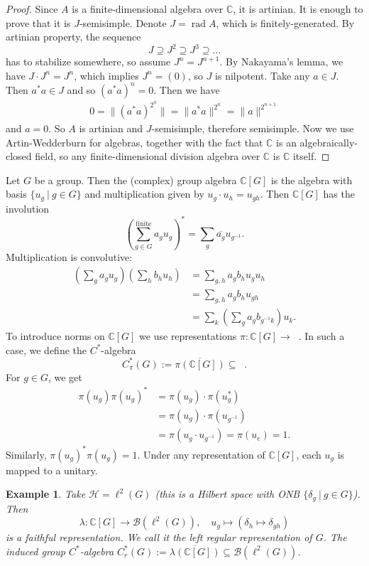 \documentclass[10pt, a4paper]{article}
\newtheorem{example}[thm]{Example}
\newenvironment{noticeC}{%
  \tcolorbox[%
  notitle,
  empty,
  enhanced,  %
  breakable,
  coltext=black, 
  fontupper=\rmfamily,
  noparskip,
  sharp corners,
  boxrule=-1pt,  %
  frame hidden,
  left=7pt,  %
  right=7pt,
  top=5pt,
  bottom=5pt,
  before skip=2.5ex plus 2pt,
  after skip=2.5ex plus 2pt,
  overlay unbroken and last={%
  },
  ]}
{\endtcolorbox}
\newenvironment{myproof}%
  {\begin{noticeC}\begin{proof}}%
  {\end{proof}\end{noticeC}}
\newcommand{\C}{\mathbb {C}}
\DeclareMathOperator{\bh}{\mathcal{B} (\mathcal{H})}
\DeclareMathOperator{\rad}{rad}
\begin{document}
\begin{myproof}
  Since $A$ is a finite-dimensional algebra over $\C$, it is artinian. It is enough to prove that it is $J$-semisimple.
  Denote $J = \rad A$, which is finitely-generated.
  By artinian property, the sequence 
  $$J \supseteq J^2 \supseteq J^3 \supseteq \dots$$
  has to stabilize somewhere, so assume $J^n = J^{n + 1}$.
  By Nakayama's lemma, we have $J \cdot J^{n} = J^n$, which implies $J^n = (0)$, so $J$ is nilpotent.
  Take any $a \in J$. Then $a^* a \in J$ and so $(a^* a)^n = 0$. Then we have 
  \begin{align*}
    0 = \| (a^* a)^{2^n} \| = \| a^* a\|^{2^n} = \| a\|^{2^{n + 1}}
  \end{align*}
  and $a = 0$. So $A$ is artinian and $J$-semisimple, therefore semisimple. Now we use Artin-Wedderburn for algebras,
  together with the fact that $\C$ is an algebraically-closed field, so any finite-dimensional division algebra over $\C$ is $\C$ itself.
\end{myproof}

Let $G$ be a group. Then the (complex) group algebra $\C [G]$ is the algebra with basis 
$\{u_g\ |\ g \in G\}$ and multiplication given by $u_g \cdot u_h = u_{gh}$.
Then $\C [G]$ has the involution 
$$\left(\sum_{g \in G} ^{\mathrm{finite}} a_g u_g\right)^* = \sum_g \overline{a_g} u_{g^{-1}}.$$
Multiplication is convolutive:
\begin{align*}
  \left(\sum_g a_g u_g\right) \left(\sum_h b_h u_h \right) &= \sum_{g, h} a_g b_h u_g u_h\\
  &= \sum_{g, h} a_g b_h u_{gh}\\
  &= \sum_k \left(\sum_g a_g b_{g^{-1} k}\right) u_k.
\end{align*}
To introduce norms on $\C[G]$ we use representations $\pi: \C [G] \to \bh$.
In such a case, we define the $C^*$-algebra 
$$C_{\pi} ^* (G) := \overline{\pi(\C [G])} \subseteq \bh.$$
For $g \in G$, we get 
\begin{align*}
  \pi(u_g) \pi(u_g) ^* &= \pi(u_g) \cdot \pi(u_g ^*)\\
  &= \pi(u_g) \cdot \pi(u_{g^{-1}})\\
  &= \pi(u_g \cdot u_{g^{-1}}) = \pi(u_e) = 1.
\end{align*}
Similarly, $\pi(u_g) ^* \pi(u_g) = 1$. Under any representation of $\C[G]$,
each $u_g$ is mapped to a unitary.

\begin{example}
  Take $\mathcal{H} = \ell^2 (G)$ (this is a Hilbert space with ONB $\{\delta_g\ |\ g \in G\}$).
  Then $$\lambda : \C [G] \to \mathcal{B} (\ell^2 (G)),\quad u_g \mapsto (\delta_h \mapsto \delta_{gh})$$
  is a faithful representation. We call it the left regular representation of $G$.
  The induced group $C^*$-algebra $C_r ^* (G) := \overline{\lambda(\C[G])} \subseteq \mathcal{B}(\ell^2 (G))$.
\end{example}
\end{document}
